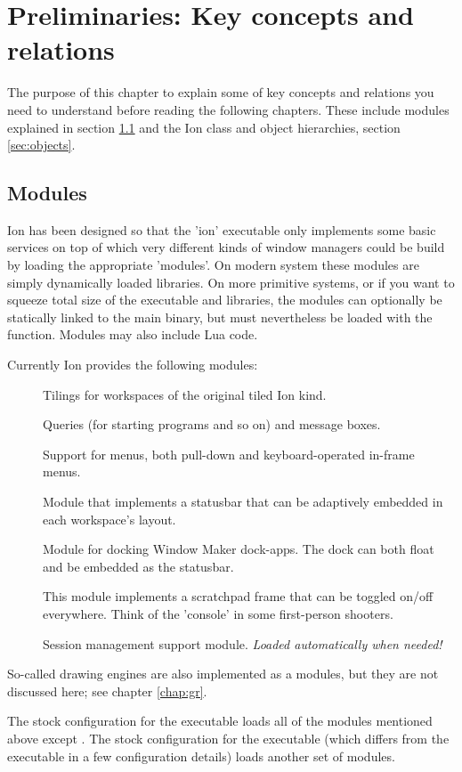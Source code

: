 
\chapter{Preliminaries: Key concepts and relations}
\label{chap:prelim}

The purpose of this chapter to explain some of key concepts and
relations you need to understand before reading the following
chapters. These include modules explained in section \ref{sec:modules}
and the Ion class and object hierarchies, section \ref{sec:objects}.


\section{Modules}
\label{sec:modules}

Ion has been designed so that the 'ion' executable only implements some
basic services on top of which very different kinds of window managers
could be build by loading the appropriate 'modules'. On modern system
these modules are simply dynamically loaded  libraries. On 
more primitive systems, or if you want to squeeze total size of the 
executable and libraries, the modules can optionally be statically 
linked to the main binary, but must nevertheless be loaded with the
 function. Modules may also include Lua code.

Currently Ion provides the following modules:

\begin{description}
    \item[] Tilings for workspaces of the original tiled
       Ion kind.
    \item[] Queries (for starting programs and so on)
      and message boxes.
    \item[] Support for menus, both pull-down and
      keyboard-operated in-frame menus.
    \item[] Module that implements a statusbar that
      can be adaptively embedded in each workspace's layout.
    \item[] Module for docking Window Maker dock-apps.
      The dock can both float and be embedded as the statusbar.
    \item[] This module implements a scratchpad frame that can
      be toggled on/off everywhere. Think of the 'console' in some 
      first-person shooters.
    \item[] Session management support module.
      \emph{Loaded automatically when needed!}
\end{description}

So-called drawing engines are also implemented as a modules,
but they are not discussed here; see chapter \ref{chap:gr}.

The stock configuration for the  executable loads all of the 
modules mentioned above except .
The stock configuration for the  executable (which differs
from the  executable in a few configuration details)
loads another set of modules.



